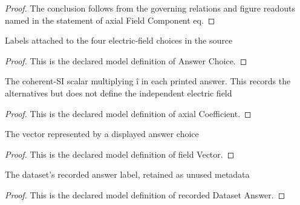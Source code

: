 \begin{proof}
  The conclusion follows from the governing relations and figure readouts named in the statement of axial Field Component eq.
\end{proof}
\begin{definition}
  \label{def:physics:phyx-mini-0995:phyxminiproblems-problemphyxmini0995-answerchoice}
  Labels attached to the four electric-field choices in the source
\end{definition}
\begin{proof}
  This is the declared model definition of Answer Choice.
\end{proof}
\begin{definition}
  \label{def:physics:phyx-mini-0995:phyxminiproblems-problemphyxmini0995-answerchoice-axialcoefficient}
  The coherent-SI scalar multiplying î in each printed answer. This records the alternatives but does not define the independent electric field
\end{definition}
\begin{proof}
  This is the declared model definition of axial Coefficient.
\end{proof}
\begin{definition}
  \label{def:physics:phyx-mini-0995:phyxminiproblems-problemphyxmini0995-answerchoice-fieldvector}
  The vector represented by a displayed answer choice
\end{definition}
\begin{proof}
  This is the declared model definition of field Vector.
\end{proof}
\begin{definition}
  \label{def:physics:phyx-mini-0995:phyxminiproblems-problemphyxmini0995-recordeddatasetanswer}
  The dataset's recorded answer label, retained as unused metadata
\end{definition}
\begin{proof}
  This is the declared model definition of recorded Dataset Answer.
\end{proof}
